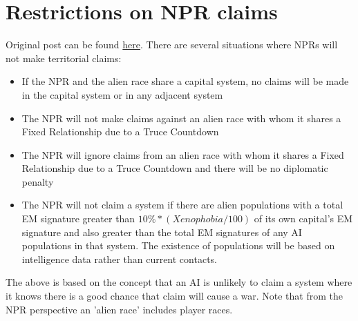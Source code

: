 \documentclass[../Aurora C# unofficial manual.tex]{subfiles}
\begin{document}
	
	\section{Restrictions on NPR claims}\label{5_restriction_on_npr_claimes}
	Original post can be found
	\href{http://aurora2.pentarch.org/index.php?topic=8495.msg118404#msg118404}{here}.
	\newline\newline
	There are several situations where NPRs will not make territorial claims:
	\begin{itemize}
		\item If the NPR and the alien race share a capital system, no claims will be made in the capital system or in any adjacent system
		\item The NPR will not make claims against an alien race with whom it shares a Fixed Relationship due to a Truce Countdown
		\item The NPR will ignore claims from an alien race with whom it shares a Fixed Relationship due to a Truce Countdown and there will be no diplomatic penalty
		\item The NPR will not claim a system if there are alien populations with a total EM signature greater than \( 10\% * (Xenophobia / 100) \) of its own capital's EM signature and also greater than the total EM signatures of any AI populations in that system. The existence of populations will be based on intelligence data rather than current contacts.
	\end{itemize}
	The above is based on the concept that an AI is unlikely to claim a system where it knows there is a good chance that claim will cause a war. Note that from the NPR perspective an 'alien race' includes player races.
	
	
\end{document}

